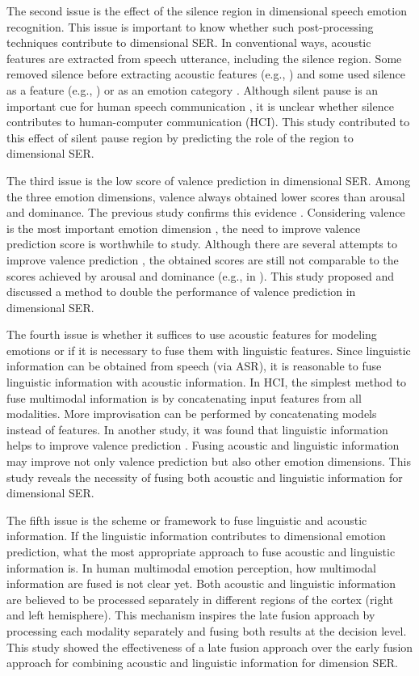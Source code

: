 The second issue is the effect of the silence region in dimensional speech
emotion recognition. This issue is important to know whether such
post-processing techniques contribute to dimensional SER. In conventional ways,
acoustic features are extracted from speech utterance, including the silence
region. Some removed silence before extracting acoustic features (e.g.,
\cite{Atmaja2019, Elbarougy2019, Mairano, Aguilar2020}) and some used silence
as a feature (e.g., \cite{Atmaja2020f, Tian2015a}) or as an emotion category
\cite{Fayek2017}. Although silent pause is an important cue for human speech
communication \cite{Ephratt2008, Tisljar-Szabo2014}, it is unclear whether
silence contributes to human-computer communication (HCI). This study
contributed to this effect of silent pause region by predicting the role of the
region to dimensional SER.

The third issue is the low score of valence prediction in dimensional SER.
Among the three emotion dimensions, valence always obtained lower scores than
arousal and dominance. The previous study confirms this evidence
\cite{Li2019b}.  Considering valence is the most important emotion dimension
\cite{Fontaine2017}, the need to improve valence prediction score is worthwhile
to study. Although there are several attempts to improve valence prediction
\cite{Zhang2019, Aldeneh2017,Sridhar2018}, the obtained scores are still not
comparable to the scores achieved by arousal and dominance (e.g., in
\cite{Sridhar2018}). This study proposed and discussed a method to double the
performance of valence prediction in dimensional SER.

The fourth issue is whether it suffices to use acoustic features for modeling
emotions or if it is necessary to fuse them with linguistic features. Since
linguistic information can be obtained from speech (via ASR), it is reasonable
to fuse linguistic information with acoustic information. In HCI, the simplest
method to fuse multimodal information is by concatenating input features from
all modalities. More improvisation can be performed by concatenating models
instead of features. In another study, it was found that linguistic information
helps to improve valence prediction \cite{Karadogan2012}. Fusing acoustic and
linguistic information may improve not only valence prediction but also other
emotion dimensions. This study reveals the necessity of fusing both acoustic
and linguistic information for dimensional SER.

The fifth issue is the scheme or framework to fuse linguistic and acoustic
information. If the linguistic information contributes to dimensional emotion
prediction, what the most appropriate approach to fuse acoustic and linguistic
information is. In human multimodal emotion perception, how multimodal
information are fused is not clear yet. Both acoustic and linguistic
information are believed to be processed separately in different regions of the
cortex (right and left hemisphere). This mechanism inspires the late fusion
approach by processing each modality separately and fusing both results at the
decision level. This study showed the effectiveness of a late fusion approach
over the early fusion approach for combining acoustic and linguistic information
for dimension SER.


